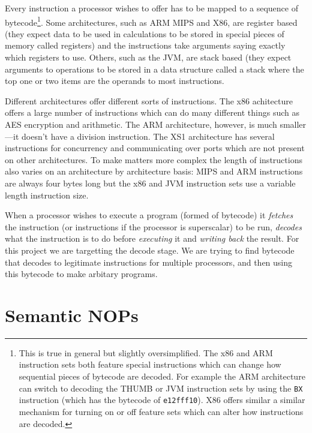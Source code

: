 \documentclass[12pt,]{book}
\begin{document}
Every instruction a processor wishes to offer has to be mapped to a
sequence of bytecode\footnote{This is true in general but slightly
  oversimplified. The x86 and ARM instruction sets both feature special
  instructions which can change how sequential pieces of bytecode are
  decoded. For example the ARM architecture\autocite{Seal:2000vd} can
  switch to decoding the THUMB or JVM instruction sets by using the
  \lstinline!BX! instruction (which has the bytecode of
  \lstinline!e12fff10!). X86\autocite{IntelCorporation:1997ta} offers
  similar a similar mechanism for turning on or off feature sets which
  can alter how instructions are decoded.}. Some architectures, such as
ARM\autocite{Seal:2000vd} MIPS\autocite{MIPSTechnologiesInc:2011ta} and
X86\autocite{IntelCorporation:1997ta}, are register based (they expect
data to be used in calculations to be stored in special pieces of memory
called registers) and the instructions take arguments saying exactly
which registers to use. Others, such as the
JVM\autocite{Lindholm:2012wy}, are stack based (they expect arguments to
operations to be stored in a data structure called a stack where the top
one or two items are the operands to most instructions.

Different architectures offer different sorts of instructions. The x86
achitecture offers a large number of instructions which can do many
different things such as AES encryption and arithmetic\autocite{refx86}.
The ARM architecture\autocite{Seal:2000vd}, however, is much
smaller---it doesn't have a division instruction. The XS1
architecture\autocite{May:ua} has several instructions for concurrency
and communicating over ports which are not present on other
architectures. To make matters more complex the length of instructions
also varies on an architecture by architecture basis: MIPS and ARM
instructions are always four bytes long but the x86 and JVM instruction
sets use a variable length instruction size.

When a processor wishes to execute a program (formed of bytecode) it
\emph{fetches} the instruction (or instructions if the processor is
superscalar) to be run, \emph{decodes} what the instruction is to do
before \emph{executing} it and \emph{writing back} the result. For this
project we are targetting the decode stage. We are trying to find
bytecode that decodes to legitimate instructions for multiple
processors, and then using this bytecode to make arbitary programs.

\section{Semantic NOPs}
\end{document}
